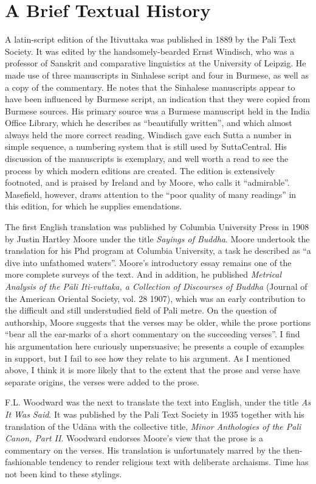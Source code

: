 \documentclass[12pt,openany]{book}%
\begin{document}
\section*{A Brief Textual History}

A latin-script edition of the Itivuttaka was published in 1889 by the Pali Text Society. It was edited by the handsomely-bearded Ernst Windisch, who was a professor of Sanskrit and comparative linguistics at the University of Leipzig. He made use of three manuscripts in Sinhalese script and four in Burmese, as well as a copy of the commentary. He notes that the Sinhalese manuscripts appear to have been influenced by Burmese script, an indication that they were copied from Burmese sources. His primary source was a Burmese manuscript held in the India Office Library, which he describes as “beautifully written”, and which almost always held the more correct reading. Windisch gave each Sutta a number in simple sequence, a numbering system that is still used by SuttaCentral. His discussion of the manuscripts is exemplary, and well worth a read to see the process by which modern editions are created. The edition is extensively footnoted, and is praised by Ireland and by Moore, who calls it “admirable”. Masefield, however, draws attention to the “poor quality of many readings” in this edition, for which he supplies emendations.

The first English translation was published by Columbia University Press in 1908 by Justin Hartley Moore under the title \textit{Sayings of Buddha}. Moore undertook the translation for his Phd program at Columbia University, a task he described as “a dive into unfathomed waters”. Moore’s introductory essay remains one of the more complete surveys of the text. And in addition, he published \textit{Metrical Analysis of the \textsanskrit{Pāli} Iti-vuttaka, a Collection of Discourses of Buddha} (Journal of the American Oriental Society, vol. 28 1907), which was an early contribution to the difficult and still understudied field of Pali metre.  On the question of authorship, Moore suggests that the verses may be older, while the prose portions “bear all the ear-marks of a short commentary on the succeeding verses”. I find his argumentation here curiously unpersuasive; he presents a couple of examples in support, but I fail to see how they relate to his argument. As I mentioned above, I think it is more likely that to the extent that the prose and verse have separate origins, the verses were added to the prose.

F.L. Woodward was the next to translate the text into English, under the title \textit{As It Was Said}. It was published by the Pali Text Society in 1935 together with his translation of the \textsanskrit{Udāna} with the collective title, \textit{Minor Anthologies of the Pali Canon, Part II}. Woodward endorses Moore’s view that the prose is a commentary on the verses. His translation is unfortunately marred by the then-fashionable tendency to render religious text with deliberate archaisms. Time has not been kind to these stylings.
\end{document}
